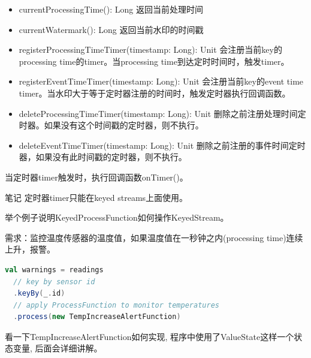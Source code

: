 \documentclass[oneside]{ctexbook}
\begin{document}
\begin{itemize}
\item currentProcessingTime(): Long 返回当前处理时间
\item currentWatermark(): Long 返回当前水印的时间戳
\item registerProcessingTimeTimer(timestamp: Long): Unit 会注册当前key的processing time的timer。当processing time到达定时时间时，触发timer。
\item registerEventTimeTimer(timestamp: Long): Unit 会注册当前key的event time timer。当水印大于等于定时器注册的时间时，触发定时器执行回调函数。
\item deleteProcessingTimeTimer(timestamp: Long): Unit 删除之前注册处理时间定时器。如果没有这个时间戳的定时器，则不执行。
\item deleteEventTimeTimer(timestamp: Long): Unit 删除之前注册的事件时间定时器，如果没有此时间戳的定时器，则不执行。
\end{itemize}

当定时器timer触发时，执行回调函数onTimer()。

\begin{bclogo}[logo=\bcinfo, couleurBarre=orange, noborder=true, couleur=white]{笔记}
定时器timer只能在keyed streams上面使用。
\end{bclogo}

举个例子说明KeyedProcessFunction如何操作KeyedStream。

需求：监控温度传感器的温度值，如果温度值在一秒钟之内(processing time)连续上升，报警。

\begin{lstlisting}[language=scala]
val warnings = readings
  // key by sensor id
  .keyBy(_.id)
  // apply ProcessFunction to monitor temperatures
  .process(new TempIncreaseAlertFunction)
\end{lstlisting}

看一下TempIncreaseAlertFunction如何实现, 程序中使用了ValueState这样一个状态变量, 后面会详细讲解。
\end{document}
